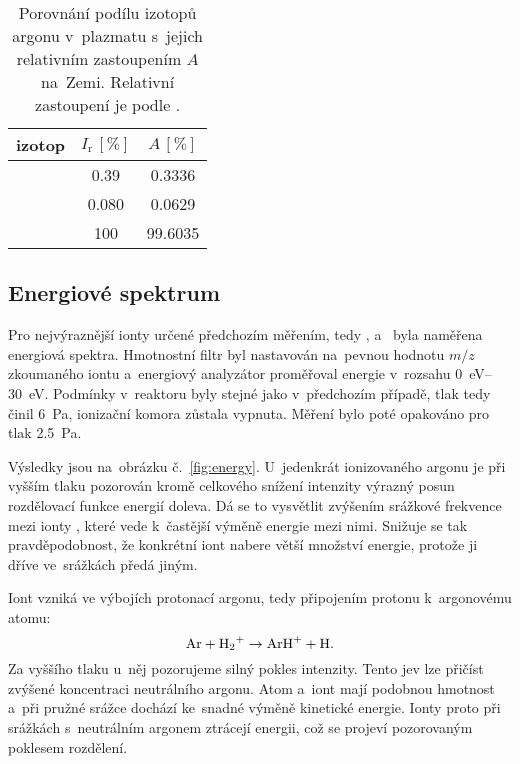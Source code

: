 \documentclass{protokol}
\newcommand\mz{m/z}
\newcommand\intens{I}
\newcommand\intensrel{\intens_\mathrm{r}}
\newcommand\abundance{A}
\begin{document}
\begin{table}
	\centering
	\caption{Porovnání podílu izotopů argonu v~plazmatu
		s~jejich relativním zastoupením $\abundance$ na~Zemi.
		Relativní zastoupení je podle \parencite{nist-ar}.}
	\label{tab:plasma-isotopes}
	\begin{tabular}{l S[table-format=3.3] S[table-format=2.4]}
		\toprule
		izotop & ${\intensrel\,[\si\percent]}$ &
			${\abundance\,[\si\percent]}$ \\
		\midrule
		 & 0.39  &  0.3336 \\
		 & 0.080 &  0.0629 \\
		 & 100   & 99.6035 \\
		\bottomrule
	\end{tabular}
\end{table}

\subsection{Energiové spektrum}
\label{sec:energy}
Pro nejvýraznější ionty určené předchozím měřením,
tedy ,  a~ byla naměřena energiová spektra.
Hmotnostní filtr byl nastavován na~pevnou hodnotu $\mz$ zkoumaného iontu
a~energiový analyzátor proměřoval energie v~rozsahu
\SIrange{0}{30}{\electronvolt}.
Podmínky v~reaktoru byly stejné jako v~předchozím případě,
tlak tedy činil \SI{6}{\pascal}, ionizační komora zůstala vypnuta.
Měření bylo poté opakováno pro tlak \SI{2.5}{\pascal}.

Výsledky jsou na~obrázku č.~\ref{fig:energy}.
U~jedenkrát ionizovaného argonu je při vyšším tlaku pozorován kromě
celkového snížení intenzity výrazný posun rozdělovací funkce energií doleva.
Dá se to vysvětlit zvýšením srážkové frekvence mezi ionty ,
které vede k~častější výměně energie mezi nimi.
Snižuje se tak pravděpodobnost, že konkrétní iont nabere větší
množství energie, protože ji dříve ve~srážkách předá jiným.

Iont  vzniká ve výbojích protonací argonu, tedy připojením
protonu k~argonovému atomu:
\begin{equation}
	\label{eq:arh}
	\ce{Ar} + \ce{H2+} \rightarrow \ce{ArH+} + \ce{H}.
\end{equation}
Za vyššího tlaku u~něj pozorujeme silný pokles intenzity.
Tento jev lze přičíst zvýšené koncentraci neutrálního argonu.
Atom  a~iont  mají podobnou hmotnost a~při pružné srážce
dochází ke~snadné výměně kinetické energie.
Ionty proto při srážkách s~neutrálním argonem ztrácejí energii,
což se projeví pozorovaným poklesem rozdělení.
\end{document}

